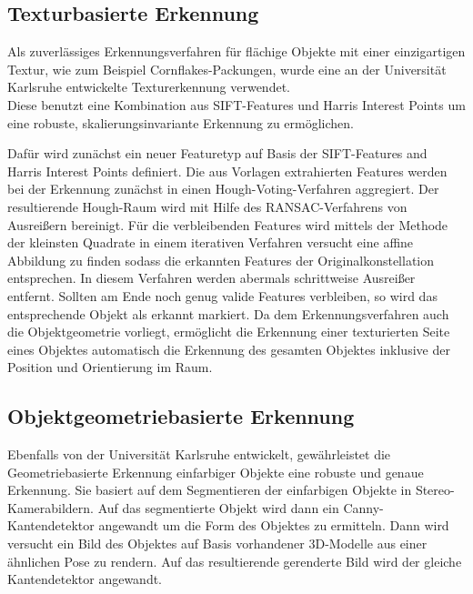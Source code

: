 \subsection{Texturbasierte Erkennung}

Als zuverlässiges Erkennungsverfahren für flächige Objekte mit einer einzigartigen Textur, wie zum Beispiel Cornflakes-Packungen, wurde eine an der Universität Karlsruhe entwickelte Texturerkennung verwendet.\\
Diese benutzt eine Kombination aus SIFT-Features und Harris Interest Points um eine robuste, skalierungsinvariante Erkennung zu ermöglichen.

Dafür wird zunächst ein neuer Featuretyp auf Basis der SIFT-Features and Harris Interest Points definiert.
Die aus Vorlagen extrahierten Features werden bei der Erkennung zunächst in einen Hough-Voting-Verfahren aggregiert.
Der resultierende Hough-Raum wird mit Hilfe des RANSAC-Verfahrens von Ausreißern bereinigt.
Für die verbleibenden Features wird mittels der Methode der kleinsten Quadrate in einem iterativen Verfahren versucht eine affine Abbildung zu finden sodass die erkannten Features der Originalkonstellation entsprechen.
In diesem Verfahren werden abermals schrittweise Ausreißer entfernt.
Sollten am Ende noch genug valide Features verbleiben, so wird das entsprechende Objekt als erkannt markiert.
Da dem Erkennungsverfahren auch die Objektgeometrie vorliegt, ermöglicht die Erkennung einer texturierten Seite eines Objektes automatisch die Erkennung des gesamten Objektes inklusive der Position und Orientierung im Raum.

\subsection{Objektgeometriebasierte Erkennung}

Ebenfalls von der Universität Karlsruhe entwickelt, gewährleistet die Geometriebasierte Erkennung einfarbiger Objekte eine robuste und genaue Erkennung.
Sie basiert auf dem Segmentieren der einfarbigen Objekte in Stereo-Kamerabildern.
Auf das segmentierte Objekt wird dann ein Canny-Kantendetektor angewandt um die Form des Objektes zu ermitteln.
Dann wird versucht ein Bild des Objektes auf Basis vorhandener 3D-Modelle aus einer ähnlichen Pose zu rendern.
Auf das resultierende gerenderte Bild wird der gleiche Kantendetektor angewandt.

